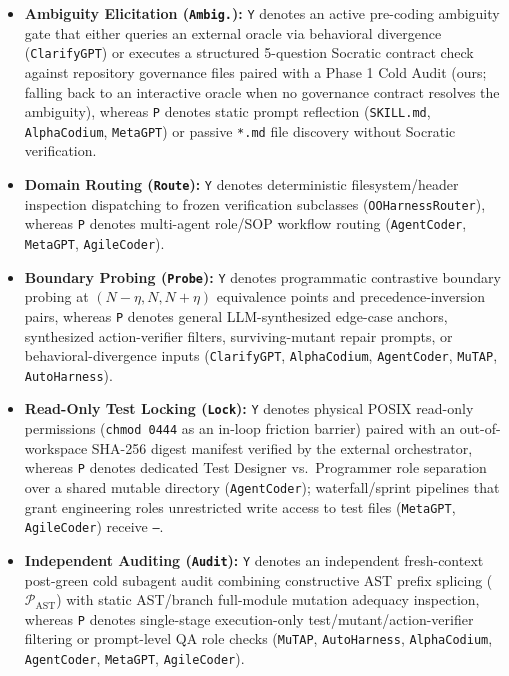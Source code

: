 \documentclass[11pt,a4paper,copyright]{google}
\begin{document}
\begin{itemize}[leftmargin=1.5em,itemsep=1.5pt,topsep=2pt]
  \item \textbf{Ambiguity Elicitation (\texttt{Ambig.}):} \texttt{Y} denotes an active pre-coding ambiguity gate that either queries an external oracle via behavioral divergence (\texttt{ClarifyGPT}) or executes a structured 5-question Socratic contract check against repository governance files paired with a Phase 1 Cold Audit (ours; falling back to an interactive oracle when no governance contract resolves the ambiguity), whereas \texttt{P} denotes static prompt reflection (\texttt{SKILL.md}, \texttt{AlphaCodium}, \texttt{MetaGPT}) or passive \texttt{*.md} file discovery without Socratic verification.
  \item \textbf{Domain Routing (\texttt{Route}):} \texttt{Y} denotes deterministic filesystem/header inspection dispatching to frozen verification subclasses (\texttt{OOHarnessRouter}), whereas \texttt{P} denotes multi-agent role/SOP workflow routing (\texttt{AgentCoder}, \texttt{MetaGPT}, \texttt{AgileCoder}).
  \item \textbf{Boundary Probing (\texttt{Probe}):} \texttt{Y} denotes programmatic contrastive boundary probing at $(N-\eta, N, N+\eta)$ equivalence points and precedence-inversion pairs, whereas \texttt{P} denotes general LLM-synthesized edge-case anchors, synthesized action-verifier filters, surviving-mutant repair prompts, or behavioral-divergence inputs (\texttt{ClarifyGPT}, \texttt{AlphaCodium}, \texttt{AgentCoder}, \texttt{MuTAP}, \texttt{AutoHarness}).
  \item \textbf{Read-Only Test Locking (\texttt{Lock}):} \texttt{Y} denotes physical POSIX read-only permissions (\texttt{chmod 0444} as an in-loop friction barrier) paired with an out-of-workspace SHA-256 digest manifest verified by the external orchestrator, whereas \texttt{P} denotes dedicated Test Designer vs.\ Programmer role separation over a shared mutable directory (\texttt{AgentCoder}); waterfall/sprint pipelines that grant engineering roles unrestricted write access to test files (\texttt{MetaGPT}, \texttt{AgileCoder}) receive \texttt{--}.
  \item \textbf{Independent Auditing (\texttt{Audit}):} \texttt{Y} denotes an independent fresh-context post-green cold subagent audit combining constructive AST prefix splicing ($\mathcal{P}_{\text{AST}}$) with static AST/branch full-module mutation adequacy inspection, whereas \texttt{P} denotes single-stage execution-only test/mutant/action-verifier filtering or prompt-level QA role checks (\texttt{MuTAP}, \texttt{AutoHarness}, \texttt{AlphaCodium}, \texttt{AgentCoder}, \texttt{MetaGPT}, \texttt{AgileCoder}).

\end{itemize}
\end{document}
